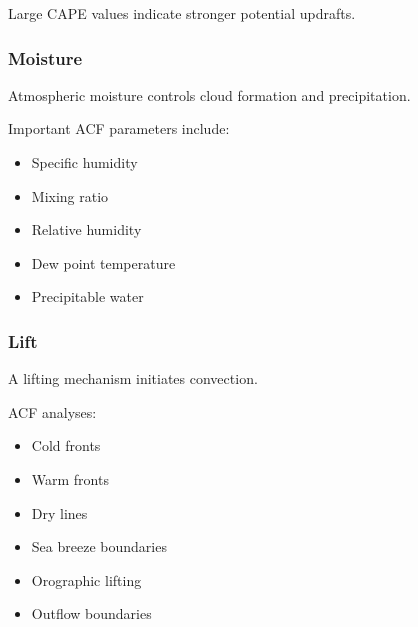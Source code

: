 Large CAPE values indicate stronger potential updrafts.


\subsubsection{Moisture}

Atmospheric moisture controls cloud formation and precipitation.

Important ACF parameters include:

\begin{itemize}

\item Specific humidity

\item Mixing ratio

\item Relative humidity

\item Dew point temperature

\item Precipitable water

\end{itemize}


\subsubsection{Lift}

A lifting mechanism initiates convection.

ACF analyses:

\begin{itemize}

\item Cold fronts

\item Warm fronts

\item Dry lines

\item Sea breeze boundaries

\item Orographic lifting

\item Outflow boundaries

\end{itemize}

